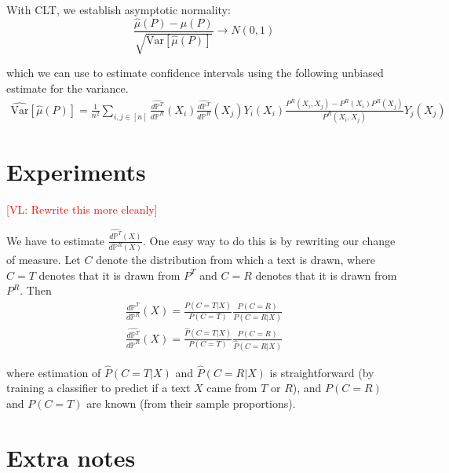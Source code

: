 \documentclass{article}
\newcommand{\vl}[1]{\textcolor{red}{[VL: #1]}}
\begin{document}
With CLT, we establish asymptotic normality:
\begin{equation*}
    \frac{\hat{\mu}(P) - \mu(P)}{\sqrt{\text{Var}[\hat{\mu}(P)]}}\rightarrow N(0,1)
\end{equation*}

which we can use to estimate confidence intervals using the following unbiased estimate for the variance.
\begin{equation*}
    \begin{split}
        \widehat{\text{Var}}[\hat{\mu}(P)] = \frac{1}{n^2} \sum_{i,j \in [n]} \frac{\hat{d \mathbb{P}^T}}{d \mathbb{P}^R}(X_i)\frac{\hat{d \mathbb{P}^T}}{d \mathbb{P}^R}(X_j)Y_i(X_i)\frac{P^R(X_i,X_j) - P^R(X_i)P^R(X_j)}{P^R(X_i,X_j)}Y_j(X_j)
    \end{split}
\end{equation*}

\section{Experiments}

\vl{Rewrite this more cleanly}

We have to estimate $\frac{\hat{d\mathbb{P}^T}(X)}{d\mathbb{P}^R(X)}$. One easy way to do this is by rewriting our change of measure. Let $C$ denote the distribution from which a text is drawn, where $C=T$ denotes that it is drawn from $P^T$ and $C=R$ denotes that it is drawn from $P^R$. Then
\begin{equation*}
    \begin{split}
        \frac{d\mathbb{P}^T}{d\mathbb{P}^R}(X) = \frac{P(C=T|X)}{P(C=T)}\frac{P(C=R)}{P(C=R|X)}
    \end{split}
\end{equation*}
\begin{equation*}
    \begin{split}
        \frac{\hat{d\mathbb{P}^T}}{d\mathbb{P}^R}(X) = \frac{\hat{P}(C=T|X)}{P(C=T)}\frac{P(C=R)}{\hat{P}(C=R|X)}
    \end{split}
\end{equation*}

where estimation of $\hat{P}(C=T|X)$ and $\hat{P}(C=R|X)$ is straightforward (by training a classifier to predict if a text $X$ came from $T$ or $R$), and $P(C=R)$ and $P(C=T)$ are known (from their sample proportions).

\section{Extra notes}
\end{document}
